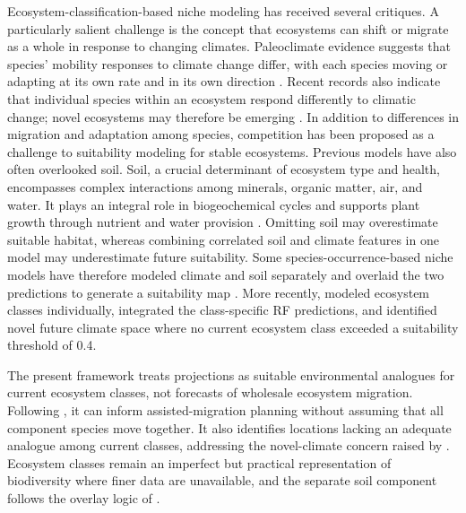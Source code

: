 \documentclass[11pt]{article}
\begin{document}
Ecosystem-classification-based niche modeling has received several critiques. A particularly salient challenge is the concept that ecosystems can shift or migrate as a whole in response to changing climates. Paleoclimate evidence suggests that species' mobility responses to climate change differ, with each species moving or adapting at its own rate and in its own direction \citep{davisShaw2001}. Recent records also indicate that individual species within an ecosystem respond differently to climatic change; novel ecosystems may therefore be emerging \citep{lurgi2012,pecl2017}. In addition to differences in migration and adaptation among species, competition has been proposed as a challenge to suitability modeling for stable ecosystems. Previous models have also often overlooked soil. Soil, a crucial determinant of ecosystem type and health, encompasses complex interactions among minerals, organic matter, air, and water. It plays an integral role in biogeochemical cycles and supports plant growth through nutrient and water provision \citep{binkleyFisher2019}. Omitting soil may overestimate suitable habitat, whereas combining correlated soil and climate features in one model may underestimate future suitability. Some species-occurrence-based niche models have therefore modeled climate and soil separately and overlaid the two predictions to generate a suitability map \citep{feng2020}. More recently, \citet{wangCampbell2026} modeled ecosystem classes individually, integrated the class-specific RF predictions, and identified novel future climate space where no current ecosystem class exceeded a suitability threshold of 0.4.

The present framework treats projections as suitable environmental analogues
for current ecosystem classes, not forecasts of wholesale ecosystem migration.
Following \citet{wang2012}, it can inform assisted-migration planning without
assuming that all component species move together. It also identifies
locations lacking an adequate analogue among current classes, addressing the
novel-climate concern raised by \citet{rehfeldt2012}. Ecosystem classes remain
an imperfect but practical representation of biodiversity where finer data
are unavailable, and the separate soil component follows the overlay logic of
\citet{feng2020}.
\end{document}
